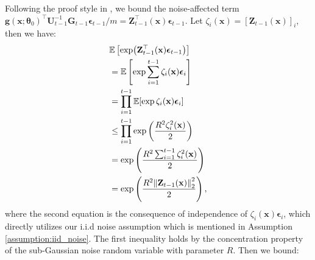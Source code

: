 Following the proof style in \citet{vakili2021optimal}, we bound the noise-affected term $\mathbf{g}(\mathbf{x}; \boldsymbol{\theta}_0)^\top \mathbf{U}^{-1}_{t-1} \mathbf{G}_{t-1} \boldsymbol{\epsilon}_{t-1}/m = \mathbf{Z}_{t-1}^\top (\mathbf{x})\boldsymbol{\epsilon}_{t-1}$. Let $\zeta_i(\mathbf{x}) = [\mathbf{Z}_{t-1}(\mathbf{x})]_i$, then we have: 
\begin{align}
    & \mathbb E \left[\exp ( \mathbf{Z}_{t-1}^\top(\mathbf{x})\boldsymbol{\epsilon}_{t-1} ) \right] \nonumber
\\
& =  \mathbb{E}\left[ \exp \sum_{i=1}^{t-1} \zeta_i(\mathbf{x}) \boldsymbol{\epsilon}_i  \right] \nonumber
\\
    & = \prod_{i=1}^{t-1} \mathbb{E} [\exp \zeta_i(\mathbf{x}) \boldsymbol{\epsilon}_i] \nonumber
\\
    &  \leq \prod_{i=1}^{t-1} \exp \left( \frac{R^2 \zeta_i^2(\mathbf{x})}{2} \right) \nonumber
\\
    &  = \exp \left (\frac{R^2 \sum_{i=1}^{t-1}\zeta_i^2(\mathbf{x})}{2} \right) \nonumber
\\
    & = \mathbb \exp \left( \frac{R^2\norm{\mathbf{Z}_{t-1}(\mathbf{x})}^2_2}{2} \right) \label{eqn:noise_effect}, 
\end{align}
where the second equation is the consequence of independence of $\zeta_i(\mathbf{x})\boldsymbol{\epsilon}_i$, which directly utilizes our i.i.d noise assumption which is mentioned in Assumption \ref{assumption:iid_noise}. The first inequality holds by the concentration property of the sub-Gaussian noise random variable with parameter $R$. Then we bound:  
